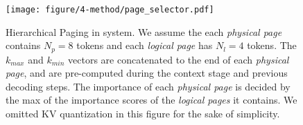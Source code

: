 \begin{figure}[t]
    \centering
    \texttt{[image: figure/4-method/page\_selector.pdf]}
    \caption{Hierarchical Paging in \system system. We assume the each \textit{physical page} contains $N_p = 8$ tokens and each \textit{logical page} has $N_l = 4$ tokens. The $k_{max}$ and $k_{min}$ vectors are concatenated to the end of each \textit{physical page}, and are pre-computed during the context stage and previous decoding steps. The importance of each \textit{physical page} is decided by the max of the importance scores of the \textit{logical pages} it contains. We omitted KV quantization in this figure for the sake of simplicity. %
    }
\label{fig:method:page_selector}
\end{figure}
